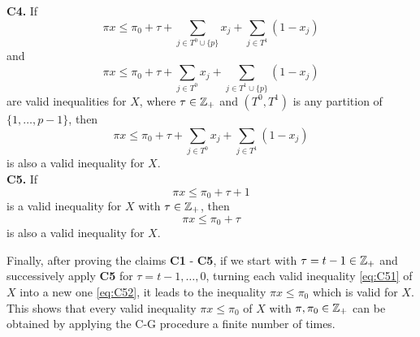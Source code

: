 \textbf{C4.} If 
\begin{equation}\label{eq:41}
\pi x \leq \pi_0 + \tau + \sum_{j\in T^0\cup \{p\}} x_j + \sum_{j\in T^1} (1-x_j)
\end{equation}
and 
\begin{equation}\label{eq:42}
\pi x \leq \pi_0 + \tau + \sum_{j\in T^0} x_j + \sum_{j\in T^1\cup \{p\}} (1-x_j)
\end{equation}
are valid inequalities for $X$, where $\tau \in \mathbb{Z}_+$ and $(T^0,T^1)$ is any partition of $\{1,\dots,p-1\}$, then
\begin{equation}\label{eq:C4}
\pi x \leq \pi_0 + \tau + \sum_{j\in T^0} x_j + \sum_{j\in T^1} (1-x_j)
\end{equation}
is also a valid inequality for $X$.\\

\textbf{C5.} If 
\begin{equation}\label{eq:C51}
\pi x \leq \pi_0 + \tau + 1
\end{equation}
is a valid inequality for $X$ with $\tau \in \mathbb{Z}_+$, then
\begin{equation}\label{eq:C52}
\pi x \leq \pi_0 + \tau
\end{equation}
is also a valid inequality for $X$.

Finally, after proving the claims \textbf{C1} - \textbf{C5}, if we start with $\tau = t-1 \in \mathbb{Z}_+$ and successively apply \textbf{C5} for $\tau = t-1,\dots,0$, turning each valid inequality \eqref{eq:C51} of $X$ into a new one \eqref{eq:C52}, it leads to the inequality $\pi x\leq \pi_0$ which is valid for $X$. This shows that every valid inequality $\pi x \leq \pi_0$ of $X$ with $\pi,\pi_0\in \mathbb{Z}_+$ can be obtained by applying the C-G procedure a finite number of times. 